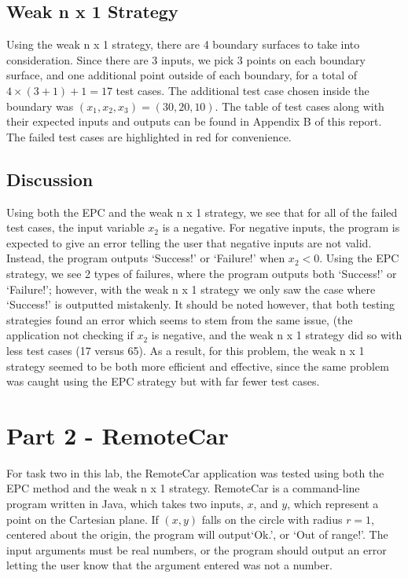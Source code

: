 \documentclass[letterpaper]{article}
\begin{document}
\subsection{Weak n x 1 Strategy}
Using the weak n x 1 strategy, there are 4 boundary surfaces to take into
consideration. Since there are 3 inputs, we pick 3 points on each boundary
surface, and one additional point outside of each boundary, for a total of
$4\times (3 + 1) + 1 = 17$ test cases. The additional test case chosen inside
the boundary was $(x_1, x_2, x_3) = (30, 20, 10)$. The table of test cases
along with their expected inputs and outputs can be found in Appendix B of this
report. The failed test cases are highlighted in red for convenience.

\subsection{Discussion}
Using both the EPC and the weak n x 1 strategy, we see that for all of the
failed test cases, the input variable $x_2$ is a negative. For negative
inputs, the program is expected to give an error telling the user that 
negative inputs are not valid. Instead, the program outputs `Success!'
or `Failure!' when $x_2 < 0$. Using the EPC strategy, we see
2 types of failures, where the program outputs both `Success!'                       
or `Failure!'; however, with the weak n x 1 strategy we only saw the case where
`Success!' is outputted mistakenly. It should be noted however, that both
testing strategies found an error which seems to stem from the same issue,
(the application not checking if $x_2$ is negative, and the weak n x 1 strategy
did so with less test cases (17 versus 65). As a result, for this problem,
the weak n x 1 strategy seemed to be both more efficient and effective,
since the same problem was caught using the EPC strategy but with far fewer
test cases.


\section{Part 2 - RemoteCar}
For task two in this lab, the RemoteCar application was tested using both the
EPC method and the weak n x 1 strategy. RemoteCar is a command-line program
written in Java, which takes two inputs, $x$, and $y$, which represent a
point on the Cartesian plane.
If $(x,y)$ falls on the circle with radius $r=1$, centered about the origin,
the program will output`Ok.', or `Out of range!'. The input arguments must
be real numbers, or the program should output an error letting the user know
that the argument entered was not a number.
\end{document}
